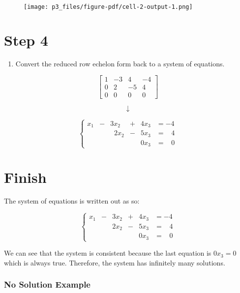 \documentclass[
  letterpaper,
  DIV=11,
  numbers=noendperiod]{scrreprt}
\providecommand{\tightlist}{%
  \setlength{\itemsep}{0pt}\setlength{\parskip}{0pt}}\usepackage{longtable,booktabs,array}
\begin{document}
\begin{figure}[H]

{\centering \texttt{[image: p3\_files/figure-pdf/cell-2-output-1.png]}

}

\end{figure}

\chapter{Step 4}

\begin{enumerate}
\def\labelenumi{\arabic{enumi}.}
\setcounter{enumi}{3}
\tightlist
\item
  Convert the reduced row echelon form back to a system of equations.
\end{enumerate}

\[
\displaystyle \left[\begin{matrix}1 & -3 & 4 & -4\\0 & 2 & -5 & 4\\0 & 0 & 0 & 0\end{matrix}\right]
\]

\[
\downarrow
\]

\[
\begin{cases}
x_1 &- &3x_2 &+ &4x_3 &= -4 \\
& &\;\;2x_2 &- &5x_3 &= \;\;\;4 \\
& & & &0x_3 &= \;\;\;0
\end{cases}
\]

\chapter{Finish}

The system of equations is written out as so:

\[
\begin{cases}
x_1 &- &3x_2 &+ &4x_3 &= -4 \\
& &2x_2 &- &5x_3 &= \;\;\;4 \\
& & & &0x_3 &= \;\;\;0
\end{cases}
\]

We can see that the system is consistent because the last equation is
\(0x_3 = 0\) which is always true. Therefore, the system has infinitely
many solutions.

\hypertarget{no-solution-example}{%
\subsection*{No Solution Example}\label{no-solution-example}}
\end{document}
